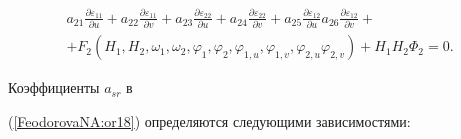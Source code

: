 \begin{multline}

a_{21}\frac{\partial \varepsilon_{11}}{\partial

u}+a_{22}\frac{\partial \varepsilon_{11}}{\partial

v}+a_{23}\frac{\partial \varepsilon_{22}}{\partial

u}+a_{24}\frac{\partial \varepsilon_{22}}{\partial

v}+a_{25}\frac{\partial \varepsilon_{12}}{\partial u}

a_{26}\frac{\partial \varepsilon_{12}}{\partial

v}+\\+F_2(H_1,H_2,\omega_1,\omega_2,\varphi_1,\varphi_2,\varphi_{1,u},\varphi_{1,v},\varphi_{2,u}\varphi_{2,v})+H_1H_2\Phi_2=0.

\label{FeodorovaNA:or18}  

\end{multline}



\noindent

Коэффициенты $a_{sr}$ в

(\ref{FeodorovaNA:or18}) определяются следующими зависимостями:


